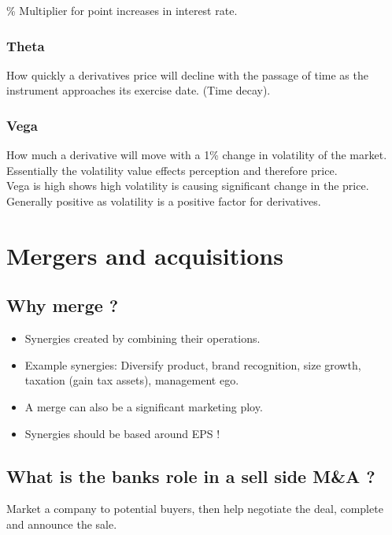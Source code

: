 \documentclass[11pt]{scrartcl} %
\begin{document}
\% Multiplier for point increases in interest rate.

\subsubsection{Theta}

How quickly a derivatives price will decline with the passage of time as the instrument approaches its exercise date. (Time decay).

\subsubsection{Vega}

How much a derivative will move with a 1\% change in volatility of the market. \\

Essentially the volatility value effects perception and therefore price.\\

Vega is high shows high volatility is causing significant change in the price. Generally positive as volatility is a positive factor for derivatives.

\section{Mergers and acquisitions}

\subsection{Why merge ?}

\begin{itemize}
	\item Synergies created by combining their operations.
	\item Example synergies: Diversify product, brand recognition, size growth, taxation (gain tax assets), management ego.
	\item A merge can also be a significant marketing ploy.
	\item Synergies should be based around EPS !
\end{itemize}

\subsection{What is the banks role in a sell side M\&A ?}

Market a company to potential buyers, then help negotiate the deal, complete and announce the sale.
\end{document}
